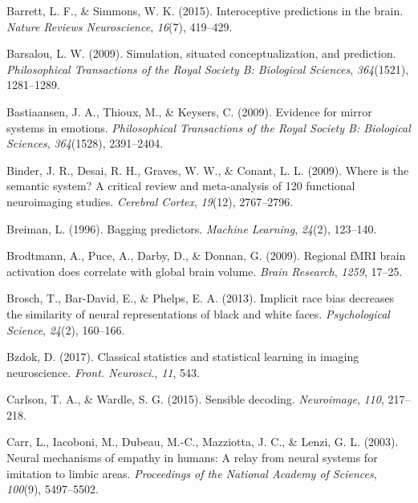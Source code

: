 \documentclass[12pt,american,a4paper,oneside,]{memoir} %
\begin{document}
\leavevmode\hypertarget{ref-barrett2015interoceptive}{}%
Barrett, L. F., \& Simmons, W. K. (2015). Interoceptive predictions in the brain. \emph{Nature Reviews Neuroscience}, \emph{16}(7), 419--429.

\leavevmode\hypertarget{ref-barsalou2009simulation}{}%
Barsalou, L. W. (2009). Simulation, situated conceptualization, and prediction. \emph{Philosophical Transactions of the Royal Society B: Biological Sciences}, \emph{364}(1521), 1281--1289.

\leavevmode\hypertarget{ref-bastiaansen2009evidence}{}%
Bastiaansen, J. A., Thioux, M., \& Keysers, C. (2009). Evidence for mirror systems in emotions. \emph{Philosophical Transactions of the Royal Society B: Biological Sciences}, \emph{364}(1528), 2391--2404.

\leavevmode\hypertarget{ref-binder2009semantic}{}%
Binder, J. R., Desai, R. H., Graves, W. W., \& Conant, L. L. (2009). Where is the semantic system? A critical review and meta-analysis of 120 functional neuroimaging studies. \emph{Cerebral Cortex}, \emph{19}(12), 2767--2796.

\leavevmode\hypertarget{ref-breiman1996bagging}{}%
Breiman, L. (1996). Bagging predictors. \emph{Machine Learning}, \emph{24}(2), 123--140.

\leavevmode\hypertarget{ref-brodtmann2009regional}{}%
Brodtmann, A., Puce, A., Darby, D., \& Donnan, G. (2009). Regional fMRI brain activation does correlate with global brain volume. \emph{Brain Research}, \emph{1259}, 17--25.

\leavevmode\hypertarget{ref-brosch2013implicit}{}%
Brosch, T., Bar-David, E., \& Phelps, E. A. (2013). Implicit race bias decreases the similarity of neural representations of black and white faces. \emph{Psychological Science}, \emph{24}(2), 160--166.

\leavevmode\hypertarget{ref-Bzdok2017-li}{}%
Bzdok, D. (2017). Classical statistics and statistical learning in imaging neuroscience. \emph{Front. Neurosci.}, \emph{11}, 543.

\leavevmode\hypertarget{ref-Carlson2015-bz}{}%
Carlson, T. A., \& Wardle, S. G. (2015). Sensible decoding. \emph{Neuroimage}, \emph{110}, 217--218.

\leavevmode\hypertarget{ref-carr2003neural}{}%
Carr, L., Iacoboni, M., Dubeau, M.-C., Mazziotta, J. C., \& Lenzi, G. L. (2003). Neural mechanisms of empathy in humans: A relay from neural systems for imitation to limbic areas. \emph{Proceedings of the National Academy of Sciences}, \emph{100}(9), 5497--5502.
\end{document}
